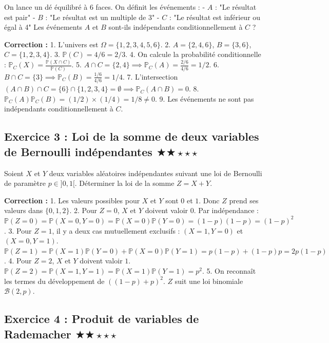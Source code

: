 \documentclass[11pt,a4paper]{article}
\begin{document}
On lance un dé équilibré à 6 faces. On définit les événements :
- $A$ : "Le résultat est pair"
- $B$ : "Le résultat est un multiple de 3"
- $C$ : "Le résultat est inférieur ou égal à 4"
Les événements $A$ et $B$ sont-ils indépendants conditionnellement à $C$ ?

\textbf{Correction :}
1. L'univers est $\Omega = \{1, 2, 3, 4, 5, 6\}$.
2. $A = \{2, 4, 6\}$, $B = \{3, 6\}$, $C = \{1, 2, 3, 4\}$.
3. $\mathbb{P}(C) = 4/6 = 2/3$.
4. On calcule la probabilité conditionnelle : $\mathbb{P}_C(X) = \frac{\mathbb{P}(X \cap C)}{\mathbb{P}(C)}$.
5. $A \cap C = \{2, 4\} \implies \mathbb{P}_C(A) = \frac{2/6}{4/6} = 1/2$.
6. $B \cap C = \{3\} \implies \mathbb{P}_C(B) = \frac{1/6}{4/6} = 1/4$.
7. L'intersection $(A \cap B) \cap C = \{6\} \cap \{1, 2, 3, 4\} = \emptyset \implies \mathbb{P}_C(A \cap B) = 0$.
8. $\mathbb{P}_C(A)\mathbb{P}_C(B) = (1/2) \times (1/4) = 1/8 \neq 0$.
9. Les événements ne sont pas indépendants conditionnellement à $C$.

\subsection*{Exercice 3 : Loi de la somme de deux variables de Bernoulli indépendantes \quad $\bigstar\bigstar\star\star\star$}

Soient $X$ et $Y$ deux variables aléatoires indépendantes suivant une loi de Bernoulli de paramètre $p \in ]0, 1[$. Déterminer la loi de la somme $Z = X + Y$.

\textbf{Correction :}
1. Les valeurs possibles pour $X$ et $Y$ sont $0$ et $1$. Donc $Z$ prend ses valeurs dans $\{0, 1, 2\}$.
2. Pour $Z = 0$, $X$ et $Y$ doivent valoir $0$. Par indépendance : $\mathbb{P}(Z=0) = \mathbb{P}(X=0, Y=0) = \mathbb{P}(X=0)\mathbb{P}(Y=0) = (1-p)(1-p) = (1-p)^2$.
3. Pour $Z = 1$, il y a deux cas mutuellement exclusifs : $(X=1, Y=0)$ et $(X=0, Y=1)$. $\mathbb{P}(Z=1) = \mathbb{P}(X=1)\mathbb{P}(Y=0) + \mathbb{P}(X=0)\mathbb{P}(Y=1) = p(1-p) + (1-p)p = 2p(1-p)$.
4. Pour $Z = 2$, $X$ et $Y$ doivent valoir $1$. $\mathbb{P}(Z=2) = \mathbb{P}(X=1, Y=1) = \mathbb{P}(X=1)\mathbb{P}(Y=1) = p^2$.
5. On reconnaît les termes du développement de $((1-p) + p)^2$. $Z$ suit une loi binomiale $\mathcal{B}(2, p)$.

\subsection*{Exercice 4 : Produit de variables de Rademacher \quad $\bigstar\bigstar\star\star\star$}
\end{document}
